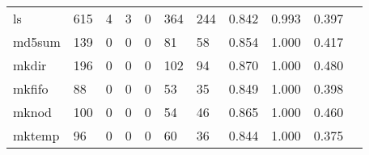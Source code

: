 \begin{longtable}{lp{1.2cm}p{1.2cm}p{1.2cm}p{1.2cm}p{1.2cm}p{1.2cm}p{1.2cm}p{1.2cm}p{1.2cm}p{1.2cm}}
ls        &                                   615 &                                                  4 &                                                  3 &                                                  0 &                                                364 &                                                244 &                                              0.842 &                                              0.993 &                                              0.397 \\
md5sum    &                                   139 &                                                  0 &                                                  0 &                                                  0 &                                                 81 &                                                 58 &                                              0.854 &                                              1.000 &                                              0.417 \\
mkdir     &                                   196 &                                                  0 &                                                  0 &                                                  0 &                                                102 &                                                 94 &                                              0.870 &                                              1.000 &                                              0.480 \\
mkfifo    &                                    88 &                                                  0 &                                                  0 &                                                  0 &                                                 53 &                                                 35 &                                              0.849 &                                              1.000 &                                              0.398 \\
mknod     &                                   100 &                                                  0 &                                                  0 &                                                  0 &                                                 54 &                                                 46 &                                              0.865 &                                              1.000 &                                              0.460 \\
mktemp    &                                    96 &                                                  0 &                                                  0 &                                                  0 &                                                 60 &                                                 36 &                                              0.844 &                                              1.000 &                                              0.375 \\

\end{longtable}
